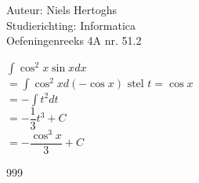 \documentclass[a4paper]{article}
\newcommand{\integraal}{\displaystyle\int}
\begin{document}
\noindent \large Auteur: Niels Hertoghs \\
\noindent \large Studierichting: Informatica \\
\noindent \large Oefeningenreeks 4A nr. 51.2 \\

\medskip

\normalsize

$\integraal\cos^2 x \sin x dx$ \\

$= \integraal\cos^2 x d(-\cos x) \text{ stel } t = \cos x$\\

$= - \integraal t^2 dt$\\

$= - \dfrac{1}{3}t^3 + C$ \\

$= - \dfrac{\cos^3 x}{3} + C$ \\

\begin{thebibliography}{999}
\end{thebibliography}
\end{document}
